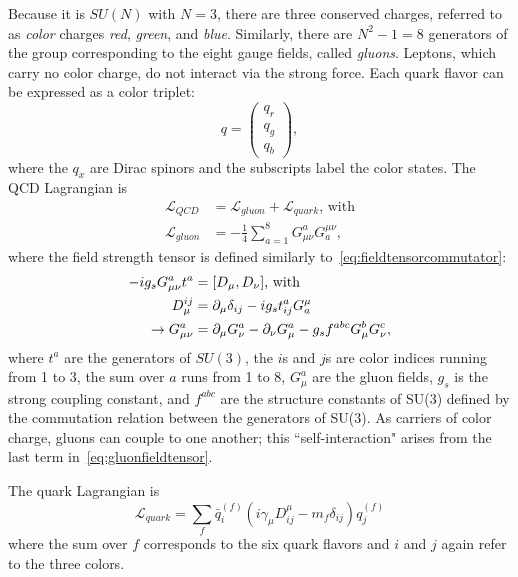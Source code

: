 Because it is $SU(N)$ with $N=3$, there are three conserved charges, referred to
as \textit{color} charges \textit{red}, \textit{green}, and \textit{blue}.
Similarly, there are $N^2-1=8$ generators of the group corresponding to the
eight gauge fields, called \textit{gluons}. Leptons, which carry no color
charge, do not interact via the strong force. Each quark flavor can be expressed
as a color triplet:
\begin{equation}
  q = \left(
    \begin{array}{c}
      q_r \\
      q_g \\
      q_b
    \end{array}
  \right),
\end{equation}
where the $q_x$ are Dirac spinors and the subscripts label the color states. The QCD Lagrangian is
\begin{align}
  \mathcal{L}_{QCD} &= \mathcal{L}_{gluon} + \mathcal{L}_{quark}\text{, with} \\
  \mathcal{L}_{gluon} &= - \frac{1}{4}\sum_{a=1}^8 G^a_{\mu\nu} G_a^{\mu\nu},
\end{align}
where the field strength tensor is defined similarly
to~\cref{eq:fieldtensorcommutator}:
\begin{align}
  -ig_sG^a_{\mu\nu}t^a
    &= \comm{D_\mu}{D_\nu}\text{, with} \\
  D_\mu^{ij}
    &= \partial_\mu\delta_{ij} - i g_s t^a_{ij}G^\mu_a \\
  \rightarrow G^a_{\mu\nu}
  &= \partial_\mu G^a_\nu
    - \partial_\nu G^a_\mu
    - g_s f^{abc} G^b_\mu G^c_\nu,
  \label{eq:gluonfieldtensor}
\end{align}
where $t^a$ are the generators of $SU(3)$, the $i$s and $j$s are color indices
running from 1 to 3, the sum over $a$ runs from 1 to 8, $G^a_\mu$ are the gluon
fields, $g_s$ is the strong coupling constant, and $f^{abc}$ are the structure
constants of SU(3) defined by the commutation relation between the generators of
SU(3). As carriers of color charge, gluons can couple to one another; this
``self-interaction" arises from the last term in~\cref{eq:gluonfieldtensor}.

The quark Lagrangian is
\begin{equation}
  \mathcal{L}_{quark}
    = \sum_{f} \bar{q}_i^{(f)}
      \left(
        i\gamma_\mu D^\mu_{ij} - m_f\delta_{ij}
      \right)q_{j}^{(f)}
\end{equation}
where the sum over $f$ corresponds to the six quark flavors and $i$ and $j$ again refer to the three colors.

